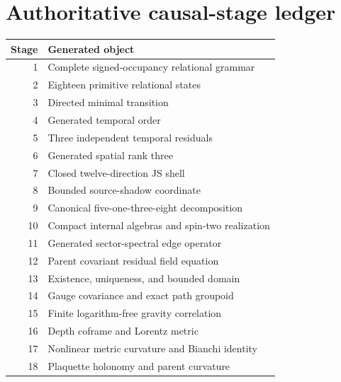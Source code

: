 \documentclass[11pt]{article}
\numberwithin{equation}{section}
\theoremstyle{remark}
\begin{document}
\section{Authoritative causal-stage ledger}
\begin{longtable}{r p{10.4cm}}
\toprule Stage&Generated object\\\midrule\endhead

1&Complete signed-occupancy relational grammar\\

2&Eighteen primitive relational states\\

3&Directed minimal transition\\

4&Generated temporal order\\

5&Three independent temporal residuals\\

6&Generated spatial rank three\\

7&Closed twelve-direction JS shell\\

8&Bounded source-shadow coordinate\\

9&Canonical five-one-three-eight decomposition\\

10&Compact internal algebras and spin-two realization\\

11&Generated sector-spectral edge operator\\

12&Parent covariant residual field equation\\

13&Existence, uniqueness, and bounded domain\\

14&Gauge covariance and exact path groupoid\\

15&Finite logarithm-free gravity correlation\\

16&Depth coframe and Lorentz metric\\

17&Nonlinear metric curvature and Bianchi identity\\

18&Plaquette holonomy and parent curvature\\


\end{longtable}
\end{document}
